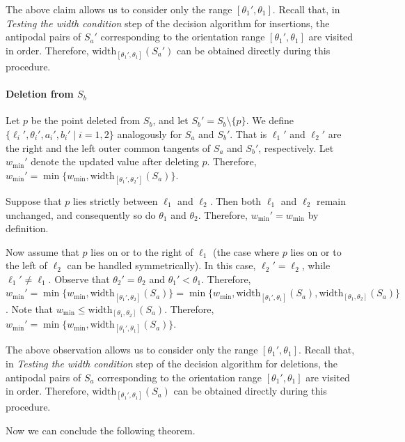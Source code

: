 \documentclass[english,a4paper, cleveref, autoref, thm-restate, nolineno]{socg-lipics-v2021}
\theoremstyle{star}
\theoremstyle{claimstar}
\newcommand{\width}{\ensuremath{\mathrm{width}}}
\begin{document}
The above claim allows us to consider only the range $[\theta_1', \theta_1]$. 
Recall that, in \emph{Testing the width condition} step of the decision algorithm for insertions, the antipodal pairs of $S_a'$ corresponding to the orientation range $[\theta_1', \theta_1]$ are visited in order.
Therefore, $\width_{[\theta_1', \theta_1]}(S_a')$ can be obtained directly during this procedure.




\paragraph*{Deletion from $S_b$}
Let $p$ be the point deleted from $S_b$, and let $S_b' = S_b \setminus \{p\}$.
We define $\{\ell_i', \theta_i', a_i', b_i' \mid i=1, 2 \}$ analogously for $S_a$ and $S_b'$. 
That is $\ell_1'$ and $\ell_2'$ are the right and the left outer common tangents of $S_a$ and $S_b'$, respectively. 
Let $w_{\min}'$ denote the updated value after deleting $p$.
Therefore, $w_{\min}' = \min \{w_{\min}, \width_{[\theta_1', \theta_2']}(S_a)\}$.


Suppose that $p$ lies strictly between $\ell_1$ and $\ell_2$. 
Then both $\ell_1$ and $\ell_2$ remain unchanged, and consequently so do $\theta_1$ and $\theta_2$.
Therefore, $w_{\min}' = w_{\min}$ by definition. 



Now assume that $p$ lies on or to the right of $\ell_1$ (the case where $p$ lies on or to the left of $\ell_2$ can be handled symmetrically).
In this case, $\ell_2' = \ell_2$, while $\ell_1' \neq \ell_1$.
Observe that $\theta_2' = \theta_2$ and $\theta_1' < \theta_1$.
Therefore, $w_{\min}' = \min \{w_{\min}, \width_{[\theta_1', \theta_2]}(S_a)\} =  \min \{w_{\min}, \width_{[\theta_1', \theta_1]}(S_a), \width_{[\theta_1, \theta_2]}(S_a)\}$.
Note that $w_{\min} \le \width_{[\theta_1, \theta_2]}(S_a) $. 
Therefore, $w_{\min}' = \min \{w_{\min}, \width_{[\theta_1', \theta_1]}(S_a) \}$.


The above observation allows us to consider only the range $[\theta_1', \theta_1]$. 
Recall that, in \emph{Testing the width condition} step of the decision algorithm for deletions, the antipodal pairs of $S_a$ corresponding to the orientation range $[\theta_1', \theta_1]$ are visited in order.
Therefore, $\width_{[\theta_1', \theta_1]}(S_a)$ can be obtained directly during this procedure.

Now we can conclude the following theorem. 
\end{document}
